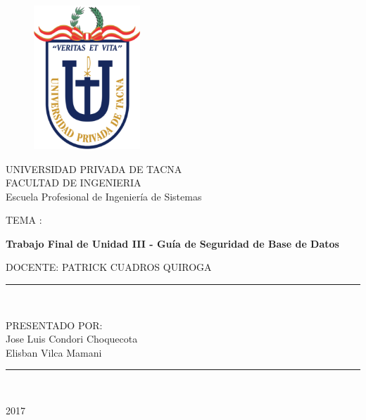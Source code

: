 \documentclass[a4paper,openright,12pt]{book}
\begin{document}
\begin{titlepage}
\begin{center}
\begin{figure}[htb]
\begin{center}
\includegraphics[width=4cm]{./images/upt}
\end{center}
\end{figure}

UNIVERSIDAD PRIVADA DE TACNA\\
\vspace*{0.10in}
FACULTAD DE INGENIERIA\\
Escuela Profesional de Ingeniería de Sistemas\\
\vspace*{0.2in}
\begin{large}
TEMA : \\
\end{large}
\vspace*{0.2in}
\begin{Large}
\textbf{Trabajo Final de Unidad III - Guía de Seguridad de Base de Datos} \\
\end{Large}
\vspace*{0.3in}
\begin{large}
DOCENTE: PATRICK CUADROS QUIROGA\\
\end{large}
\vspace*{0.3in}
\rule{80mm}{0.1mm}\\
\vspace*{0.1in}
\begin{large}
PRESENTADO POR: \\
Jose Luis Condori Choquecota \\
Elisban Vilca Mamani\\


\end{large}
\rule{80mm}{0.1mm}\\
\begin{large}
2017\\
\end{large}
\end{center}
\end{titlepage}
\end{document}
